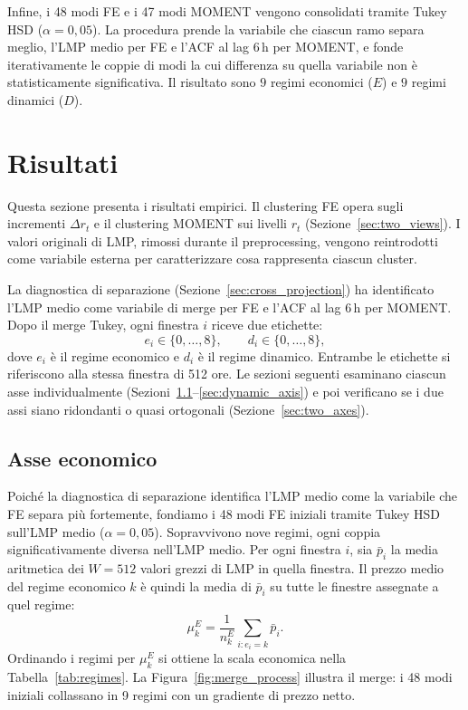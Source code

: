 \documentclass[12pt]{article}
\begin{document}
Infine, i 48 modi FE e i 47 modi MOMENT vengono consolidati tramite Tukey HSD ($\alpha = 0{,}05$).
\label{sec:tukey_merge}
La procedura prende la variabile che ciascun ramo separa meglio, l'LMP medio per FE e l'ACF al lag 6\,h per MOMENT, e fonde iterativamente le coppie di modi la cui differenza su quella variabile non è statisticamente significativa.
Il risultato sono $9$ regimi economici ($E$) e $9$ regimi dinamici ($D$).



\section{Risultati}
\label{sec:results}

Questa sezione presenta i risultati empirici.
Il clustering FE opera sugli incrementi $\Delta r_t$ e il clustering MOMENT sui livelli $r_t$ (Sezione~\ref{sec:two_views}).
I valori originali di LMP, rimossi durante il preprocessing, vengono reintrodotti come variabile esterna per caratterizzare cosa rappresenta ciascun cluster.

La diagnostica di separazione (Sezione~\ref{sec:cross_projection}) ha identificato l'LMP medio come variabile di merge per FE e l'ACF al lag 6\,h per MOMENT.
Dopo il merge Tukey, ogni finestra $i$ riceve due etichette:
\begin{equation}
e_i \in \{0,\ldots,8\},
\qquad
d_i \in \{0,\ldots,8\},
\label{eq:final_labels}
\end{equation}
dove $e_i$ è il regime economico e $d_i$ è il regime dinamico.
Entrambe le etichette si riferiscono alla stessa finestra di 512 ore.
Le sezioni seguenti esaminano ciascun asse individualmente (Sezioni~\ref{sec:economic_axis}--\ref{sec:dynamic_axis}) e poi verificano se i due assi siano ridondanti o quasi ortogonali (Sezione~\ref{sec:two_axes}).

\subsection{Asse economico}
\label{sec:economic_axis}

Poiché la diagnostica di separazione identifica l'LMP medio come la variabile che FE separa più fortemente, fondiamo i 48 modi FE iniziali tramite Tukey HSD sull'LMP medio ($\alpha = 0{,}05$).
Sopravvivono nove regimi, ogni coppia significativamente diversa nell'LMP medio.
Per ogni finestra $i$, sia $\bar{p}_i$ la media aritmetica dei $W = 512$ valori grezzi di LMP in quella finestra.
Il prezzo medio del regime economico $k$ è quindi la media di $\bar{p}_i$ su tutte le finestre assegnate a quel regime:
\begin{equation}
\mu_k^{E}
=
\frac{1}{n_k^{E}}
\sum_{i:e_i=k}
\bar{p}_i.
\label{eq:economic_regime_mean}
\end{equation}
Ordinando i regimi per $\mu_k^{E}$ si ottiene la scala economica nella Tabella~\ref{tab:regimes}.
La Figura~\ref{fig:merge_process} illustra il merge: i 48 modi iniziali collassano in 9 regimi con un gradiente di prezzo netto.
\end{document}
